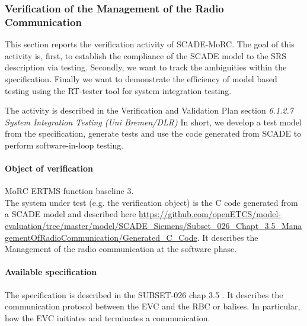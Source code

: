 
\newcommand{\tbi}[1]{$<$\textit{#1}$>$}

\newcommand{\nl}{\mbox{}\\}
\newcommand{\nlskip}[1]{\mbox{}\\[#1]}

%
\newcommand{\cmmnt}[1]{\framebox{#1}}
\newcommand{\bgcmmnt}[1]{\nl\framebox{\parbox{.95\textwidth}{#1}}\nl[2mm]}
%

\newcommand{\eod}{\nl\rule{.95\textwidth}{1pt}\nl\textit{End of Document}}


\subsubsection{Verification of the  Management of the Radio Communication}

This section reports the verification activity of SCADE-MoRC. The goal
of this activity is, first, to establish the compliance of the SCADE
model to the SRS description via testing. Secondly, we want to track
the ambiguities within the specification. Finally we want to
demonstrate the efficiency of model based testing using the RT-tester
tool for system integration testing.

The activity is described in the Verification and Validation Plan
section {\em 6.1.2.7 System Integration Testing (Uni Bremen/DLR)} \cite{D4.1_2013}
In short, we develop a test model from the specification, generate tests and use
the code generated from SCADE to perform software-in-loop testing.

\paragraph{Object of verification}
 MoRC ERTMS function baseline 3.
\nl


The system under test (e.g. the verification object) is the C code
generated from a SCADE model and described here
\url{https://github.com/openETCS/model-evaluation/tree/master/model/SCADE_Siemens/Subset_026_Chapt_3.5_ManagementOfRadioCommunication/Generated_C_Code}.
It describes the Management of the radio communication at the software
phase.




\paragraph{Available specification}

The specification is described in the
SUBSET-026\cite{unisig_subset-026_2012} chap 3.5 \cite{chap3-5}. It
describes the communication protocol between the EVC and the RBC or
balises. In particular, how the EVC initiates and terminates a
communication.



